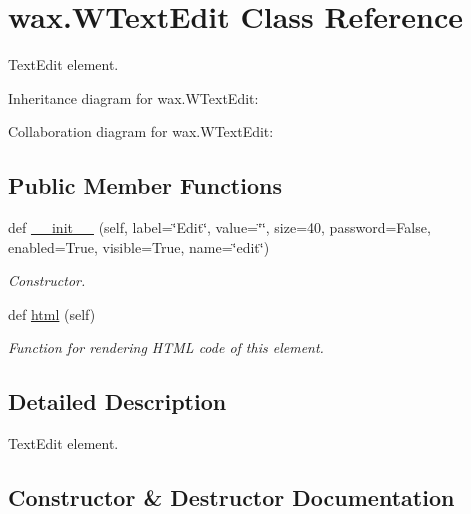 \hypertarget{classwax_1_1WTextEdit}{}\section{wax.\+W\+Text\+Edit Class Reference}
\label{classwax_1_1WTextEdit}


Text\+Edit element.  




Inheritance diagram for wax.\+W\+Text\+Edit\+:


Collaboration diagram for wax.\+W\+Text\+Edit\+:
\subsection*{Public Member Functions}
\begin{DoxyCompactItemize}
\item 
def \hyperlink{classwax_1_1WTextEdit_a3c25c540da61c668247742b20c193066}{\+\_\+\+\_\+init\+\_\+\+\_\+} (self, label=\char`\"{}Edit\char`\"{}, value=\char`\"{}\char`\"{}, size=40, password=False, enabled=True, visible=True, name=\char`\"{}edit\char`\"{})
\begin{DoxyCompactList}\small\item\em Constructor. \end{DoxyCompactList}\item 
def \hyperlink{classwax_1_1WTextEdit_ad6a22b65606b4b2c1061ea07a479ad48}{html} (self)
\begin{DoxyCompactList}\small\item\em Function for rendering H\+T\+ML code of this element. \end{DoxyCompactList}\end{DoxyCompactItemize}


\subsection{Detailed Description}
Text\+Edit element. 

\subsection{Constructor \& Destructor Documentation}
